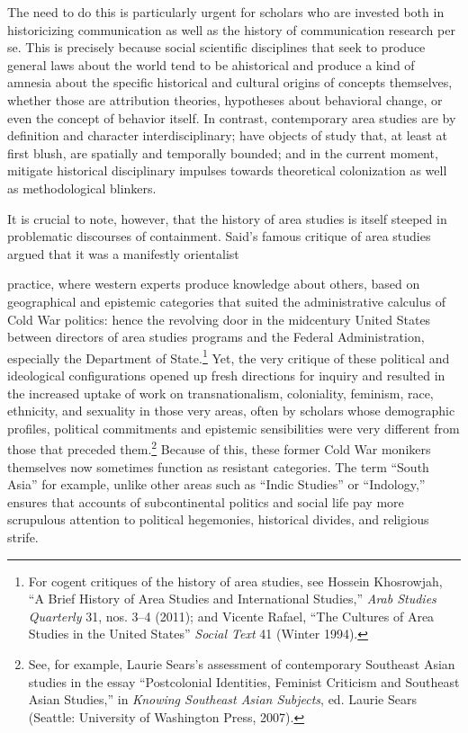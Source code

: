 \documentclass{tufte-handout}
\begin{document}
\begin{titlepage}
The need to do this is particularly urgent for scholars who are invested
both in historicizing communication as well as the history of
communication research per se. This is precisely because social
scientific disciplines that seek to produce general laws about the world
tend to be ahistorical and produce a kind of amnesia about the specific
historical and cultural origins of concepts themselves, whether those
are attribution theories, hypotheses about behavioral change, or even
the concept of behavior itself. In contrast, contemporary area studies
are by definition and character interdisciplinary; have objects of study
that, at least at first blush, are spatially and temporally bounded; and
in the current moment, mitigate historical disciplinary impulses towards
theoretical colonization as well as methodological blinkers.

It is crucial to note, however, that the history of area studies is
itself steeped in problematic discourses of containment. Said's famous
critique of area studies argued that it was a manifestly orientalist


\enlargethispage{2\baselineskip}

\vspace*{2em}





 \end{titlepage}



\noindent practice, where western experts produce knowledge about others, based on
geographical and epistemic categories that suited the administrative
calculus of Cold War politics: hence the revolving door in the
midcentury United States between directors of area studies programs and
the Federal Administration, especially the Department of
State.\footnote{For cogent critiques of the history of area studies, see
  Hossein Khosrowjah, ``A Brief History of Area Studies and
  International Studies,'' \emph{Arab Studies Quarterly} 31, nos. 3--4
  (2011); and Vicente Rafael, ``The Cultures of Area Studies in the
  United States'' \emph{Social Text} 41 (Winter 1994).} Yet, the very
critique of these political and ideological configurations opened up
fresh directions for inquiry and resulted in the increased uptake of
work on transnationalism, coloniality, feminism, race, ethnicity, and
sexuality in those very areas, often by scholars whose demographic
profiles, political commitments and epistemic sensibilities were very
different from those that preceded them.\footnote{See, for example,
  Laurie Sears's assessment of contemporary Southeast Asian studies in
  the essay ``Postcolonial Identities, Feminist Criticism and Southeast
  Asian Studies,'' in \emph{Knowing Southeast Asian Subjects}, ed.
  Laurie Sears (Seattle: University of Washington Press, 2007).} Because
of this, these former Cold War monikers themselves now sometimes
function as resistant categories. The term ``South Asia'' for example,
unlike other areas such as ``Indic Studies'' or ``Indology,'' ensures
that accounts of subcontinental politics and social life pay more
scrupulous attention to political hegemonies, historical divides, and
religious strife.
\end{document}

